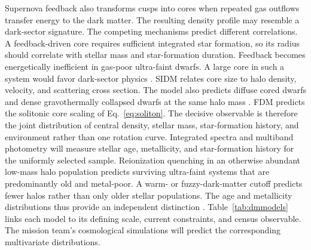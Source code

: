 Supernova feedback also transforms cusps into cores when repeated gas outflows transfer energy to the dark matter. The resulting density profile may resemble a dark-sector signature. The competing mechanisms predict different correlations. A feedback-driven core requires sufficient integrated star formation, so its radius should correlate with stellar mass and star-formation duration. Feedback becomes energetically inefficient in gas-poor ultra-faint dwarfs. A large core in such a system would favor dark-sector physics \cite{deblok2010,bullock2017}. SIDM relates core size to halo density, velocity, and scattering cross section. The model also predicts diffuse cored dwarfs and dense gravothermally collapsed dwarfs at the same halo mass \cite{kaplinghat2016,ren2019}. FDM predicts the solitonic core scaling of Eq.~\eqref{eq:soliton}. The decisive observable is therefore the joint distribution of central density, stellar mass, star-formation history, and environment rather than one rotation curve. Integrated spectra and multiband photometry will measure stellar age, metallicity, and star-formation history for the uniformly selected sample. Reionization quenching in an otherwise abundant low-mass halo population predicts surviving ultra-faint systems that are predominantly old and metal-poor. A warm- or fuzzy-dark-matter cutoff predicts fewer halos rather than only older stellar populations. The age and metallicity distributions thus provide an independent distinction \cite{kirby2013}. Table~\ref{tab:dmmodels} links each model to its defining scale, current constraints, and census observable. The mission team's cosmological simulations will predict the corresponding multivariate distributions.

